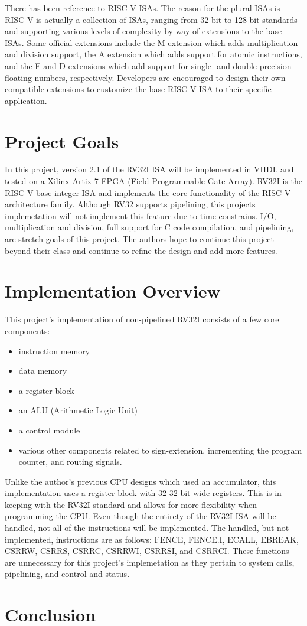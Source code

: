 \documentclass[lettersize,journal]{IEEEtran}
\begin{document}
There has been reference to RISC-V ISAs. The reason for the plural ISAs is RISC-V is actually a collection of ISAs, 
ranging from 32-bit to 128-bit standards and supporting various levels of complexity by way of extensions to the base ISAs. 
Some official extensions include the M extension which adds multiplication and division support, 
the A extension which adds support for atomic instructions, and the F and D extensions which add support for single- and double-precision floating numbers, 
respectively. Developers are encouraged to design their own compatible extensions to customize the base RISC-V ISA to their specific application. 

\section{Project Goals}
In this project, version 2.1 of the RV32I ISA will be implemented in VHDL and tested on a Xilinx Artix 7 FPGA (Field-Programmable Gate Array). 
RV32I is the RISC-V base integer ISA and implements the core functionality of the RISC-V architecture family. 
Although RV32 supports pipelining, this projects implemetation will not implement this feature due to time constrains. 
I/O, multiplication and division, full support for C code compilation, and pipelining, are stretch goals of this project. 
The authors hope to continue this project beyond their class and continue to refine the design and add more features.
 
\section{Implementation Overview}
This project's implementation of non-pipelined RV32I consists of a few core components:
\begin{itemize}
    \item instruction memory
    \item data memory
    \item a register block
    \item an ALU (Arithmetic Logic Unit)
    \item a control module
    \item various other components related to sign-extension, incrementing the program counter, and routing signals. 
\end{itemize}
Unlike the author's previous CPU designs which used an accumulator, this implementation uses a register block with 32 32-bit wide registers.
This is in keeping with the RV32I standard and allows for more flexibility when programming the CPU.
Even though the entirety of the RV32I ISA will be handled, not all of the instructions will be implemented.
The handled, but not implemented, instructions are as follows: FENCE, FENCE.I, ECALL, EBREAK, CSRRW, CSRRS, CSRRC, CSRRWI, CSRRSI, and CSRRCI.
These functions are unnecessary for this project's implemetation as they pertain to system calls, pipelining, and control and status.

\section{Conclusion}
\color{red}{TBD}

\nocite{*}

\end{document}

